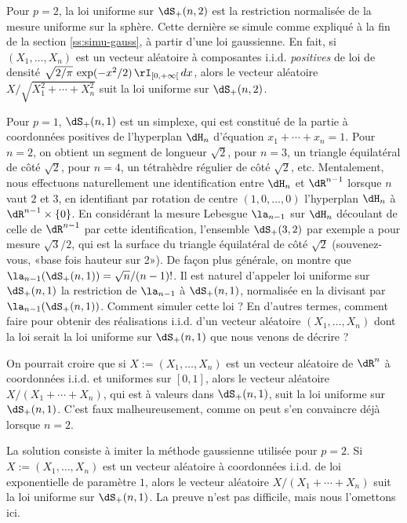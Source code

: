 Pour $p=2$, la loi uniforme sur $\dS_+(n,2)$ est la restriction normalisée de
la mesure uniforme sur la sphère. Cette dernière se simule comme expliqué à la
fin de la section \ref{ss:simu-gauss}, à partir d'une loi gaussienne. En fait,
si $(X_1,\ldots,X_n)$ est un vecteur aléatoire à composantes i.i.d.
\emph{positives} de loi de densité
$\sqrt{2/\pi}\,\exp(-x^2/2)\,\rI_{[0,+\infty[}\,dx$, alors le vecteur aléatoire
$X/\sqrt{X_1^2+\cdots+X_n^2}$ suit la loi uniforme sur $\dS_+(n,2)$.

Pour $p=1$, $\dS_+(n,1)$ est un simplexe, qui est constitué de la partie à
coordonnées positives de l'hyperplan $\dH_n$ d'équation $x_1+\cdots+x_n=1$.
Pour $n=2$, on obtient un segment de longueur $\sqrt{2}$, pour $n=3$, un
triangle équilatéral de côté $\sqrt{2}$, pour $n=4$, un tétrahèdre régulier de
côté $\sqrt{2}$, etc.  Mentalement, nous effectuons naturellement une
identification entre $\dH_n$ et $\dR^{n-1}$ lorsque $n$ vaut $2$ et $3$, en
identifiant par rotation de centre $(1,0,\ldots,0)$ l'hyperplan $\dH_n$ à
$\dR^{n-1}\times\{0\}$. En considérant la mesure Lebesgue $\la_{n-1}$ sur
$\dH_n$ découlant de celle de $\dR^{n-1}$ par cette identification, l'ensemble
$\dS_+(3,2)$ par exemple a pour mesure $\sqrt{3}/2$, qui est la surface du
triangle équilatéral de côté $\sqrt{2}$ (souvenez-vous, «base fois hauteur sur
2»). De façon plus générale, on montre que
$\la_{n-1}(\dS_+(n,1))=\sqrt{n}/(n-1)!$. Il est naturel d'appeler loi uniforme
sur $\dS_+(n,1)$ la restriction de $\la_{n-1}$ à $\dS_+(n,1)$, normalisée en
la divisant par $\la_{n-1}(\dS_+(n,1))$. Comment simuler cette loi ? En
d'autres termes, comment faire pour obtenir des réalisations i.i.d. d'un
vecteur aléatoire $(X_1,\ldots,X_n)$ dont la loi serait la loi uniforme sur
$\dS_+(n,1)$ que nous venons de décrire ?

On pourrait croire que si $X:=(X_1,\ldots,X_n)$ est un vecteur aléatoire de
$\dR^n$ à coordonnées i.i.d. et uniformes sur $[0,1]$, alors le vecteur
aléatoire $X/(X_1+\cdots+X_n)$, qui est à valeurs dans $\dS_+(n,1)$, suit la
loi uniforme sur $\dS_+(n,1)$. C'est faux malheureusement, comme on peut s'en
convaincre déjà lorsque $n=2$.

La solution consiste à imiter la méthode gaussienne utilisée pour $p=2$. Si
$X:=(X_1,\ldots,X_n)$ est un vecteur aléatoire à coordonnées i.i.d. de loi
exponentielle de paramètre $1$, alors le vecteur aléatoire
$X/(X_1+\cdots+X_n)$ suit la loi uniforme sur $\dS_+(n,1)$. La preuve n'est
pas difficile, mais nous l'omettons ici.

